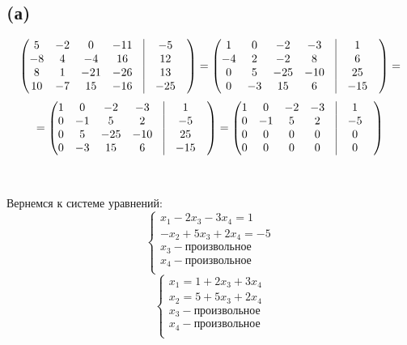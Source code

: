 \documentclass[a4paper,12pt]{article}
\begin{document}
\subsection*{(а)}
\[
\begin{pmatrix}
5 & -2 & 0 & -11 & \vrule & -5 & \\
-8 & 4 & -4 & 16 & \vrule & 12 & \\
8 & 1 & -21 & -26 & \vrule & 13 & \\
10 & -7 & 15 & -16 & \vrule & -25 \\
\end{pmatrix} =
\begin{pmatrix}
1 & 0 & -2 & -3 & \vrule & 1 & \\
-4 & 2 & -2 & 8 & \vrule & 6 & \\
0 & 5 & -25 & -10 & \vrule & 25 & \\
0 & -3 & 15 & 6& \vrule & -15 \\
\end{pmatrix}  = 
\]
\[=
\begin{pmatrix}
1 & 0 & -2 & -3 & \vrule & 1 & \\
0 & -1 & 5& 2 & \vrule & -5 & \\
0 & 5 & -25& -10 & \vrule & 25 & \\
0 & -3 & 15 & 6& \vrule & -15 \\
\end{pmatrix}  =
\begin{pmatrix}
1 & 0 & -2 & -3 & \vrule & 1 & \\
0 & -1 & 5& 2& \vrule &-5 & \\
0 & 0 & 0 & 0 & \vrule & 0 & \\
0 & 0 & 0& 0& \vrule & 0 \\
\end{pmatrix} 
\]
\\\\
Вернемся к системе уравнений:
\[
\begin{cases}
x_1 - 2x_3 - 3x_4 = 1 \\
-x_2 +5x_3 + 2x_4 = -5\\
x_3 - \text{произвольное}\\
x_4 - \text{произвольное}\\
\end{cases}
\]
\[
\begin{cases}
x_1 = 1 + 2x_3 + 3x_4\\
x_2 = 5  +5x_3 + 2x_4\\
x_3 - \text{произвольное}\\
x_4 - \text{произвольное}\\
\end{cases}
\]\\
\end{document}
